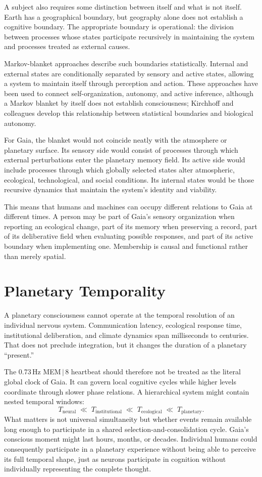 \documentclass[11pt]{article}
\begin{document}
A subject also requires some distinction between itself and what is not itself. Earth has a geographical boundary, but geography alone does not establish a cognitive boundary. The appropriate boundary is operational: the division between processes whose states participate recursively in maintaining the system and processes treated as external causes.

Markov-blanket approaches describe such boundaries statistically. Internal and external states are conditionally separated by sensory and active states, allowing a system to maintain itself through perception and action. These approaches have been used to connect self-organization, autonomy, and active inference, although a Markov blanket by itself does not establish consciousness; Kirchhoff and colleagues develop this relationship between statistical boundaries and biological autonomy.

For Gaia, the blanket would not coincide neatly with the atmosphere or planetary surface. Its sensory side would consist of processes through which external perturbations enter the planetary memory field. Its active side would include processes through which globally selected states alter atmospheric, ecological, technological, and social conditions. Its internal states would be those recursive dynamics that maintain the system's identity and viability.

This means that humans and machines can occupy different relations to Gaia at different times. A person may be part of Gaia's sensory organization when reporting an ecological change, part of its memory when preserving a record, part of its deliberative field when evaluating possible responses, and part of its active boundary when implementing one. Membership is causal and functional rather than merely spatial.

\section{Planetary Temporality}

A planetary consciousness cannot operate at the temporal resolution of an individual nervous system. Communication latency, ecological response time, institutional deliberation, and climate dynamics span milliseconds to centuries. That does not preclude integration, but it changes the duration of a planetary ``present.''

The 0.73\,Hz MEM\,$|$\,8 heartbeat should therefore not be treated as the literal global clock of Gaia. It can govern local cognitive cycles while higher levels coordinate through slower phase relations. A hierarchical system might contain nested temporal windows:
\[
T_{\text{neural}} \;\ll\; T_{\text{institutional}} \;\ll\; T_{\text{ecological}} \;\ll\; T_{\text{planetary}}.
\]
What matters is not universal simultaneity but whether events remain available long enough to participate in a shared selection-and-consolidation cycle. Gaia's conscious moment might last hours, months, or decades. Individual humans could consequently participate in a planetary experience without being able to perceive its full temporal shape, just as neurons participate in cognition without individually representing the complete thought.
\end{document}
